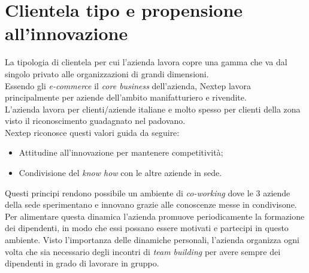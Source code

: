 \section{Clientela tipo e propensione all’innovazione}
La tipologia di clientela per cui l'azienda lavora copre una gamma che va dal singolo privato alle organizzazioni di grandi dimensioni.\\Essendo gli \emph{e-commerce} il \emph{core business} dell'azienda, Nextep lavora principalmente per aziende dell'ambito manifatturiero e rivendite.\\L'azienda lavora per clienti/aziende italiane e molto spesso per clienti della zona visto il riconoscimento guadagnato nel padovano.\\Nextep riconosce questi valori guida da seguire:
\begin{itemize}
\item Attitudine all'innovazione per mantenere competitività;
\item Condivisione del \emph{know how} con le altre aziende in sede.
\end{itemize}
Questi principi rendono possibile un ambiente di \emph{co-working} dove le 3 aziende della sede sperimentano e innovano grazie alle conoscenze messe in condivisone. Per alimentare questa dinamica l'azienda promuove periodicamente la formazione dei dipendenti, in modo che essi possano essere motivati e partecipi in questo ambiente. Visto l'importanza delle dinamiche personali, l'azienda organizza ogni volta che sia necessario degli incontri di \emph{team building} per avere sempre dei dipendenti in grado di lavorare in gruppo.  
